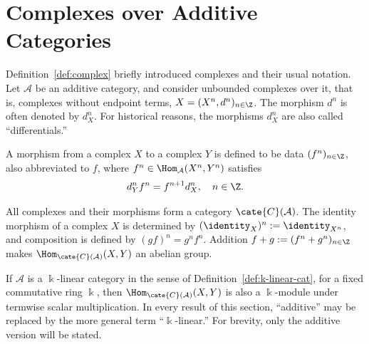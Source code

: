 
\section{Complexes over Additive Categories}\label{sec:additive-cplx}
\hypertarget{o014.aljabr2.chapter3.complexes-over-additive-categories}{ }

Definition~\ref{def:complex} briefly introduced complexes and their usual
notation. Let $\mathcal{A}$ be an additive category, and consider unbounded
complexes over it, that is, complexes without endpoint terms,
$X=(X^n,d^n)_{n\in\Z}$. The morphism $d^n$ is often denoted by $d_X^n$.
For historical reasons, the morphisms $d_X^n$ are also called
``differentials.''

\begin{definition}\label{def:cplx-cat}
	A morphism from a complex $X$ to a complex $Y$ is defined to be data
	$(f^n)_{n\in\Z}$, also abbreviated to $f$, where
	$f^n\in\Hom_{\mathcal{A}}(X^n,Y^n)$ satisfies
	\[ d_Y^n f^n=f^{n+1}d_X^n,\quad n\in\Z. \]

	All complexes and their morphisms form a category $\cate{C}(\mathcal{A})$.
	The identity morphism of a complex $X$ is determined by
	$(\identity_X)^n:=\identity_{X^n}$, and composition is defined by
	$(gf)^n=g^nf^n$. Addition
	$f+g:=(f^n+g^n)_{n\in\Z}$ makes
	$\Hom_{\cate{C}(\mathcal{A})}(X,Y)$ an abelian group.
\end{definition}

If $\mathcal{A}$ is a $\Bbbk$-linear category in the sense of
Definition~\ref{def:k-linear-cat}, for a fixed commutative ring $\Bbbk$,
then $\Hom_{\cate{C}(\mathcal{A})}(X,Y)$ is also a $\Bbbk$-module under
termwise scalar multiplication. In every result of this section, ``additive''
may be replaced by the more general term ``$\Bbbk$-linear.'' For brevity,
only the additive version will be stated.

